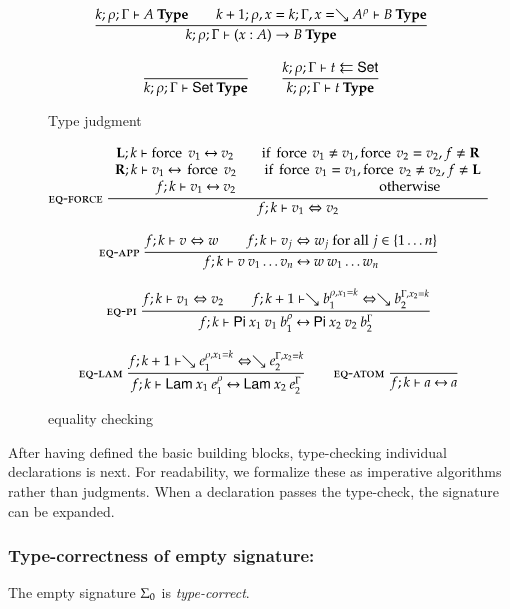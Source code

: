\begin{figure}[htp]
\begin{gather*}
\ \dfrac{k;\rho;\Gamma\vdash A\:\mathbf{Type}
\qquad
k+1;\rho,x=k;\Gamma,x=\searrow A^{\rho}\vdash B\:\mathbf{Type}}{k;\rho;\Gamma\vdash( x : A ) \rightarrow{B}\:\mathbf{Type}}
\\[2ex]
\ \dfrac{}{k;\rho;\Gamma\vdash\mathsf{Set}\:\mathbf{Type}}
\qquad
\ \dfrac{k;\rho;\Gamma\vdash t\leftleftarrows\mathsf{Set}}{k;\rho;\Gamma\vdash t\:\mathbf{Type}}
\end{gather*}
\caption{Type judgment}
\label{ftype}
\end{figure}

\begin{figure}[htp]
\begin{gather*}
\mbox{\sc eq-force}\ \dfrac{\begin{array}[b]{c}\mathbf{L};k\vdash\operatorname{force} \; v_1{\:\leftrightarrow\:}v_2 \qquad \mbox{if } \operatorname{force} \: v_1 \neq v_1 , \operatorname{force} \: v_2 = v_2  , f \neq \mathbf{R}
\\\mathbf{R};k\vdash v_1{\:\leftrightarrow\:}\operatorname{force} \; v_2 \qquad \mbox{if } \operatorname{force} \: v_1 = v_1 , \operatorname{force} \: v_2 \neq v_2 , f \neq \mathbf{L} \\f;k\vdash v_1{\:\leftrightarrow\:}v_2 \qquad \qquad \qquad \qquad \qquad \mbox{ otherwise}\end{array}}{f;k\vdash v_1\Leftrightarrow v_2}
\\[2ex]
\mbox{\sc eq-app}\ \dfrac{f;k\vdash v\Leftrightarrow w \qquad
f;k\vdash v_j\Leftrightarrow w_j \mbox{ for all } j \in \{ 1 \ldots n\}}{f;k\vdash v \: v_1 \ldots v_n{\:\leftrightarrow\:}w \: w_1 \ldots w_n}
\\[2ex]
\mbox{\sc eq-pi}\ \dfrac{f;k\vdash v_1\Leftrightarrow v_2
\qquad
f;k+1\vdash\searrow b_1^{\rho,x_1=k}\Leftrightarrow\searrow b_2^{\Gamma,x_2=k}}{f;k\vdash\mathsf{Pi} \: x_1 \: v_1 \: b_1^{\rho}{\:\leftrightarrow\:}\mathsf{Pi} \: x_2 \: v_2 \: b_2^{\Gamma}}
\\[2ex]
\mbox{\sc eq-lam}\ \dfrac{f;k+1\vdash\searrow e_1^{\rho,x_1=k}\Leftrightarrow\searrow e_2^{\Gamma,x_2=k}}{f;k\vdash\mathsf{Lam} \: x_1 \: e_1^{\rho}{\:\leftrightarrow\:}\mathsf{Lam} \: x_2 \: e_2^{\Gamma}}
\qquad
\mbox{\sc eq-atom}\ \dfrac{}{f;k\vdash a{\:\leftrightarrow\:}a}
\end{gather*}
\caption{equality checking}
\label{feq}
\end{figure}

After having defined the basic building blocks, type-checking individual declarations is next.
For readability, we formalize these as imperative algorithms rather than judgments. 
When a declaration passes the type-check, the signature can be expanded. 
\subsubsection{Type-correctness of empty signature:}
The empty signature $\Sigma_0$ is \emph{type-correct}.

